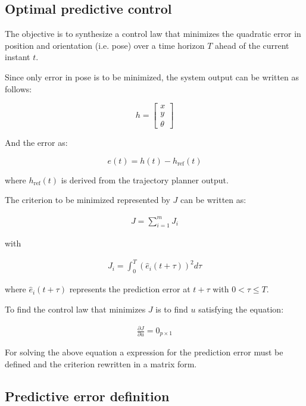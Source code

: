 \documentclass[letterpaper, 10 pt, conference]{ieeeconf}  %
\begin{document}
\subsection{Optimal predictive control}

The objective is to synthesize a control law that minimizes the quadratic error in position and orientation (i.e. pose) over a time horizon $T$ ahead of the current instant $t$.

Since only error in pose is to be minimized, the system output can be written as follows:

\[
h = \left[\begin{array}{c}
x\\
y\\
\theta
\end{array}
\right]
\]

And the error as:

\[
	e(t) =  h(t) - h_{\text{ref}}(t)
\]

where $h_{\text{ref}}(t)$ is derived from the trajectory planner output.

The criterion to be minimized represented by $J$ can be written as:

\begin{align*}
J = \sum_{i=1}^m J_i 
\end{align*}

with

\begin{align*}
J_i = \int_0^{T} (\hat{e}_i(t+\tau))^2d\tau
\end{align*}

where $\hat{e}_i(t+\tau)$ represents the prediction error at $t+\tau$ with $0 < \tau \leq T$.

To find the control law that minimizes $J$ is to find $u$ satisfying the equation:

\begin{align*}
\frac{\partial J}{\partial u} = 0_{p\times 1}
\end{align*}

For solving the above equation a expression for the prediction error must be defined and the criterion rewritten in a matrix form.


\subsection{Predictive error definition}
\end{document}
